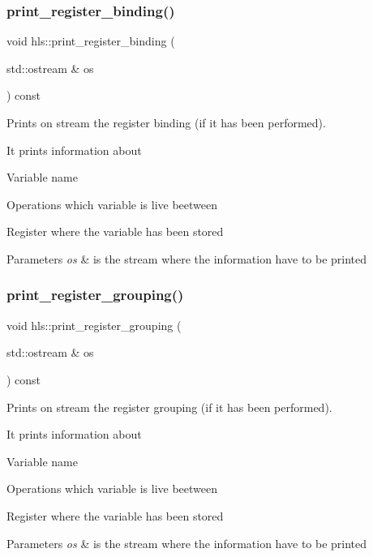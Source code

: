 \subsubsection{\texorpdfstring{print\+\_\+register\+\_\+binding()}{print\_register\_binding()}}
{\footnotesize\ttfamily void hls\+::print\+\_\+register\+\_\+binding (\begin{DoxyParamCaption}\item[{std\+::ostream \&}]{os }\end{DoxyParamCaption}) const}



Prints on stream the register binding (if it has been performed). 

It prints information about
\begin{DoxyItemize}
\item Variable name
\item Operations which variable is live beetween
\item Register where the variable has been stored 
\begin{DoxyParams}{Parameters}
{\em os} & is the stream where the information have to be printed \\
\hline
\end{DoxyParams}

\end{DoxyItemize}\mbox{\label{classhls_ade13876660ef2da09f930f9c3243d138}} 
\subsubsection{\texorpdfstring{print\+\_\+register\+\_\+grouping()}{print\_register\_grouping()}}
{\footnotesize\ttfamily void hls\+::print\+\_\+register\+\_\+grouping (\begin{DoxyParamCaption}\item[{std\+::ostream \&}]{os }\end{DoxyParamCaption}) const}



Prints on stream the register grouping (if it has been performed). 

It prints information about
\begin{DoxyItemize}
\item Variable name
\item Operations which variable is live beetween
\item Register where the variable has been stored 
\begin{DoxyParams}{Parameters}
{\em os} & is the stream where the information have to be printed \\
\hline
\end{DoxyParams}

\end{DoxyItemize}\mbox{\label{classhls_ac9ec57688c391652f3788021ce09ced2}} 
